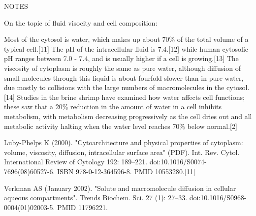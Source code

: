 NOTES

On the topic of fluid visocity and cell composition:

Most of the cytosol is water, which makes up about 70\% of the total volume of a typical cell.[11] The pH of the intracellular fluid is 7.4.[12] while human cytosolic pH ranges between 7.0 - 7.4, and is usually higher if a cell is growing.[13] The viscosity of cytoplasm is roughly the same as pure water, although diffusion of small molecules through this liquid is about fourfold slower than in pure water, due mostly to collisions with the large numbers of macromolecules in the cytosol.[14] Studies in the brine shrimp have examined how water affects cell functions; these saw that a 20\% reduction in the amount of water in a cell inhibits metabolism, with metabolism decreasing progressively as the cell dries out and all metabolic activity halting when the water level reaches 70\% below normal.[2]

Luby-Phelps K (2000). "Cytoarchitecture and physical properties of cytoplasm: volume, viscosity, diffusion, intracellular surface area" (PDF). Int. Rev. Cytol. International Review of Cytology 192: 189–221. doi:10.1016/S0074-7696(08)60527-6. ISBN 978-0-12-364596-8. PMID 10553280.[11]

Verkman AS (January 2002). "Solute and macromolecule diffusion in cellular aqueous compartments". Trends Biochem. Sci. 27 (1): 27–33. doi:10.1016/S0968-0004(01)02003-5. PMID 11796221.